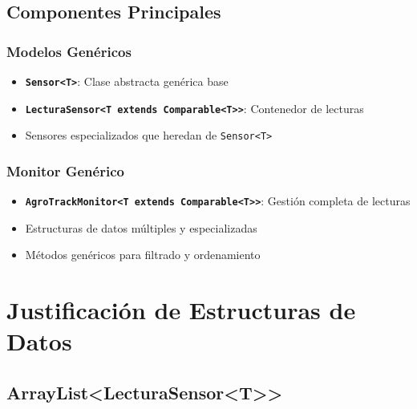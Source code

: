 \documentclass[12pt,a4paper]{article}
\begin{document}


\subsection{Componentes Principales}

\subsubsection{Modelos Genéricos}

\begin{itemize}
    \item \textbf{\texttt{Sensor<T>}}: Clase abstracta genérica base
    \item \textbf{\texttt{LecturaSensor<T extends Comparable<T>>}}: Contenedor de lecturas
    \item Sensores especializados que heredan de \texttt{Sensor<T>}
\end{itemize}

\subsubsection{Monitor Genérico}

\begin{itemize}
    \item \textbf{\texttt{AgroTrackMonitor<T extends Comparable<T>>}}: Gestión completa de lecturas
    \item Estructuras de datos múltiples y especializadas
    \item Métodos genéricos para filtrado y ordenamiento
\end{itemize}


\section{Justificación de Estructuras de Datos}

\subsection{ArrayList<LecturaSensor<T>>}
\end{document}
